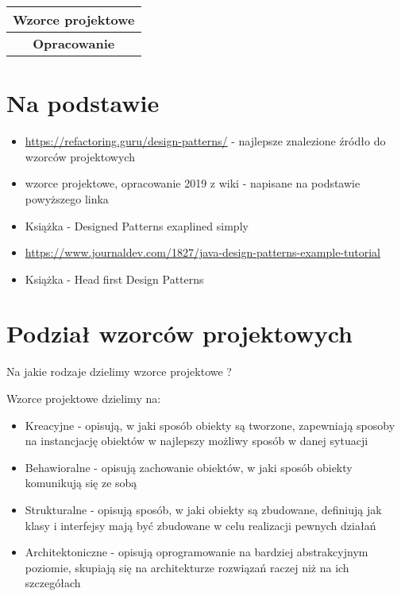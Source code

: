 \documentclass[a4paper,15pt]{article}
\newcommand{\ques}[2]{
    \begin{tcolorbox}[colback=black!5!white,colframe=black,title={
\texttt{[image: icon.png]}
Pytanie #1}]
        #2
    \end{tcolorbox}
}
\begin{document}
\begin{table}
\begin{center}
\begin{tabular}{|c|c|c|}
\hline
\multicolumn{3}{|c|}{Wzorce projektowe} \\ \hline \multicolumn{3}{|c|}{\textbf{Opracowanie}} \\ \hline
\end{tabular}
\end{center}
\end{table}

\tableofcontents

\newpage
\section{Na podstawie}

\begin{itemize}
\item \url{https://refactoring.guru/design-patterns/} - najlepsze znalezione źródło do wzorców projektowych
\item wzorce projektowe, opracowanie 2019 z wiki - napisane na podstawie powyższego linka
\item Książka - Designed Patterns exaplined simply
\item \url{https://www.journaldev.com/1827/java-design-patterns-example-tutorial}
\item Książka - Head first Design Patterns
\end{itemize}



\newpage
\section{Podział wzorców projektowych}

\ques{}{
Na jakie rodzaje dzielimy wzorce projektowe ?
}
Wzorce projektowe dzielimy na:
\begin{itemize}
\item Kreacyjne - opisują, w jaki sposób obiekty są tworzone, zapewniają sposoby na instancjację obiektów w najlepszy możliwy sposób w danej sytuacji
\item Behawioralne - opisują zachowanie obiektów, w jaki sposób obiekty komunikują się ze sobą
\item Strukturalne -  opisują sposób, w jaki obiekty są zbudowane, definiują jak klasy i interfejsy mają być zbudowane w celu realizacji pewnych działań
\item Architektoniczne - opisują oprogramowanie na bardziej abstrakcyjnym poziomie, skupiają się na architekturze rozwiązań raczej niż na ich szczegółach
\end{itemize}
\end{document}

